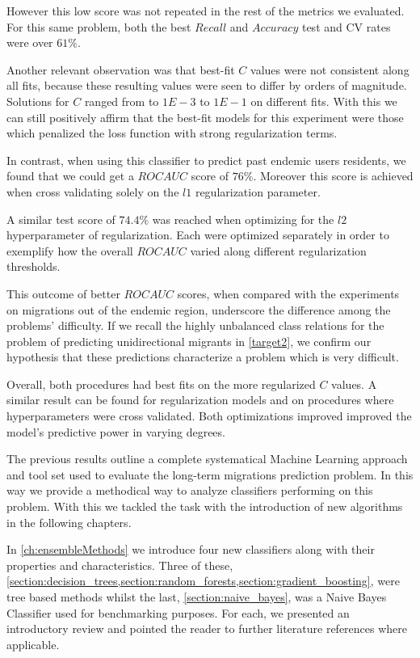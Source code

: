 However this low score was not repeated in the rest of the metrics we evaluated.
For this same problem, both the best $Recall$ and $Accuracy$ test and CV rates were over $61\%$.

Another relevant observation was that best-fit $C$ values were not consistent along all fits, because these resulting values were seen to differ by orders of magnitude.
Solutions for $C$ ranged from to $1E-3$ to $1E-1$ on different fits.
With this we can still positively affirm that the best-fit models for this experiment were those which penalized the loss function with strong regularization terms.


In contrast, when using this classifier to predict past endemic users residents, we found that we could get a $ROC AUC$ score of $76\%$.
Moreover this score is achieved when cross validating solely on the $l1$ regularization parameter.

A similar test score of $74.4\%$ was reached when optimizing for the $l2$ hyperparameter of regularization.
Each were optimized separately in order to exemplify how the overall $ROC AUC$ varied along different regularization thresholds.

This outcome of better $ROC AUC$ scores, when compared with the experiments on migrations out of the endemic region, underscore the difference among the problems' difficulty.
If we recall the highly unbalanced class relations for the problem of predicting unidirectional migrants in \cref{target2}, we confirm our hypothesis that these predictions characterize a problem which is very difficult.

Overall, both procedures had best fits on the more regularized $C$ values.
A similar result can be found for regularization models and on procedures where hyperparameters were cross validated.
Both optimizations improved improved the model's predictive power in varying degrees.


The previous results outline a complete systematical Machine Learning approach and tool set used to evaluate the long-term migrations prediction problem.
In this way we provide a methodical way to analyze classifiers performing on this problem.
With this we tackled the task with the introduction of new algorithms in the following chapters.



In \cref{ch:ensembleMethods} we introduce four new classifiers along with their properties and characteristics. Three of these, \cref{section:decision_trees,section:random_forests,section:gradient_boosting}, were tree based methods whilst the last, \cref{section:naive_bayes}, was a Naive Bayes Classifier used for benchmarking purposes.
For each, we presented an introductory review and pointed the reader to further literature references where applicable.

